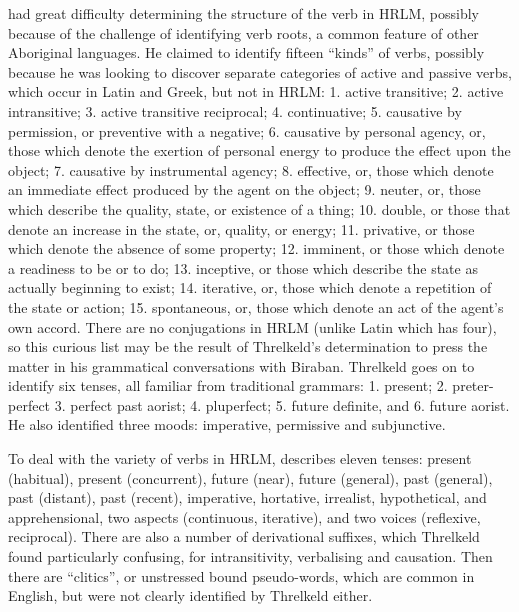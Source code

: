 {\citet[28--74]{threlkeld_selection_1834} had great difficulty determining the structure of the verb in HRLM, possibly because of the challenge of identifying verb roots, a common feature of other Aboriginal languages. He claimed to identify fifteen “kinds” of verbs, possibly because he was looking to discover separate categories of active and passive verbs, which occur in Latin and Greek, but not in HRLM: 1. active transitive; 2. active intransitive; 3. active transitive reciprocal; 4. continuative; 5. causative by permission, or preventive with a negative;  6. causative by personal agency, or, those which denote the exertion of personal energy to produce the effect upon the object; 7. causative by instrumental agency; 8. effective, or, those which denote an immediate effect produced by the agent on the object; 9. neuter, or, those which describe the quality, state, or existence of a thing; 10. double, or those that denote an increase in the state, or, quality, or energy; 11. privative, or those which denote the absence of some property; 12. imminent, or those which denote a readiness to be or to do; 13. inceptive, or those which describe the state as actually beginning to exist; 14. iterative, or, those which denote a repetition of the state or action; 15. spontaneous, or, those which denote an act of the agent’s own accord. There are no conjugations in HRLM (unlike Latin which has four), so this curious list may be the result of Threlkeld’s determination to press the matter in his grammatical conversations with Biraban. Threlkeld goes on to identify six tenses, all familiar from traditional grammars: 1. present; 2. preter-perfect 3. perfect past aorist; 4. pluperfect; 5. future definite, and 6. future aorist. He also identified three moods: imperative, permissive and subjunctive. 

To deal with the variety of verbs in HRLM, \citet{lissarrague_salvage_2006} describes eleven tenses: present (habitual), present (concurrent), future (near), future (general), past (general), past (distant), past (recent), imperative, hortative, irrealist, hypothetical, and apprehensional, two aspects (continuous, iterative), and two voices (reflexive, reciprocal). There are also a number of derivational suffixes, which Threlkeld found particularly confusing, for intransitivity, verbalising and causation. Then there are “clitics”, or unstressed bound pseudo-words, which are common in English, but were not clearly identified by Threlkeld either.

}

